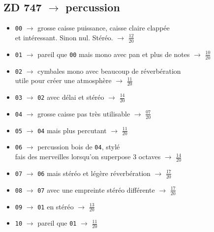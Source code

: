 \documentclass[a4paper, 13pt]{article}
\begin{document}
\vspace{0.5cm}
\subsection*{ZD 747 $\rightarrow$ percussion}
\begin{itemize}
    \item \texttt{00} $\rightarrow$ grosse caisse puissance, caisse claire clappée \\ et intéressant. Sinon nul. Stéréo. $\rightarrow$ \Large{$\frac{12}{20}$} \normalsize \vspace{0.2cm}
    \item \texttt{01} $\rightarrow$ pareil que \texttt{00} mais mono avec pan et plus de notes $\rightarrow$ \Large{$\frac{10}{20}$} \normalsize \vspace{0.2cm}
    \item \texttt{02} $\rightarrow$ cymbales mono avec beaucoup de réverbération \\ utile pour créer une atmosphère $\rightarrow$ \Large{$\frac{11}{20}$} \normalsize \vspace{0.2cm}
    \item \texttt{03} $\rightarrow$ \texttt{02} avec délai et stéréo $\rightarrow$ \Large{$\frac{14}{20}$} \normalsize \vspace{0.2cm}
    \item \texttt{04} $\rightarrow$ grosse caisse pas très utilisable $\rightarrow$ \Large{$\frac{07}{20}$} \normalsize \vspace{0.2cm}
    \item \texttt{05} $\rightarrow$ \texttt{04} mais plus percutant $\rightarrow$ \Large{$\frac{11}{20}$} \normalsize \vspace{0.2cm}
    \item \texttt{06} $\rightarrow$ percussion bois de \texttt{04}, stylé \\ fais des merveilles lorsqu'on superpose 3 octaves $\rightarrow$ \Large{$\frac{14}{20}$} \normalsize \vspace{0.2cm}
    \item \texttt{07} $\rightarrow$ \texttt{06} mais stéréo et légère réverbération $\rightarrow$ \Large{$\frac{17}{20}$} \normalsize \vspace{0.2cm}
    \item \texttt{08} $\rightarrow$ \texttt{07} avec une empreinte stéréo différente $\rightarrow$ \Large{$\frac{17}{20}$} \normalsize \vspace{0.2cm}
    \item \texttt{09} $\rightarrow$ \texttt{01} en stéréo $\rightarrow$ \Large{$\frac{13}{20}$} \normalsize \vspace{0.2cm}
    \item \texttt{10} $\rightarrow$ pareil que \texttt{01} $\rightarrow$ \Large{$\frac{11}{20}$} \normalsize \vspace{0.2cm}
\end{itemize}
\end{document}
